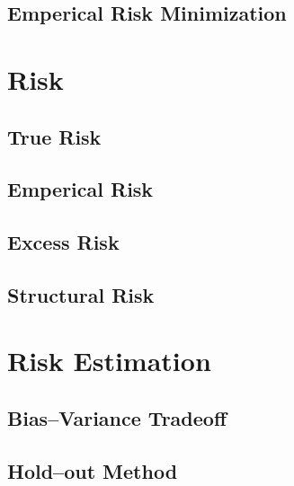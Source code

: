 \documentclass[18pt,a3paper,landscape, ncols=3]{cheatsheet}
\begin{document}
	\subsection{Emperical Risk Minimization}
		\begin{mdframed}
		\end{mdframed}

\section{Risk} \seperator
	\subsection{True Risk}
		\begin{mdframed}
		\end{mdframed}
	\subsection{Emperical Risk}
		\begin{mdframed}
		\end{mdframed}
	\subsection{Excess Risk}
		\begin{mdframed}
		\end{mdframed}
	\subsection{Structural Risk}
		\begin{mdframed}
		\end{mdframed}

	\section{Risk Estimation}
		\subsection{Bias--Variance Tradeoff}
			\begin{mdframed}
			\end{mdframed}
		\subsection{Hold--out Method}
			\begin{mdframed}
			\end{mdframed}
\end{document}
